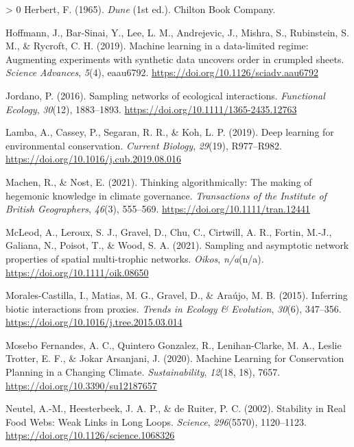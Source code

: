\documentclass[11pt]{article}
\newlength{\cslhangindent}
\newenvironment{CSLReferences}[3] %
 {%
  \setlength{\parindent}{0pt}
  \ifodd #1 \everypar{\setlength{\hangindent}{\cslhangindent}}\ignorespaces\fi
  \ifnum #2 > 0
  \setlength{\parskip}{#2\baselineskip}
  \fi
 }%
 {}
\begin{document}
\begin{CSLReferences}{1}{0}
\leavevmode\hypertarget{ref-Herbert1965Dun}{}%
Herbert, F. (1965). \emph{Dune} (1st ed.). Chilton Book Company.

\leavevmode\hypertarget{ref-Hoffmann2019MacLea}{}%
Hoffmann, J., Bar-Sinai, Y., Lee, L. M., Andrejevic, J., Mishra, S.,
Rubinstein, S. M., \& Rycroft, C. H. (2019). Machine learning in a
data-limited regime: Augmenting experiments with synthetic data uncovers
order in crumpled sheets. \emph{Science Advances}, \emph{5}(4),
eaau6792. \url{https://doi.org/10.1126/sciadv.aau6792}

\leavevmode\hypertarget{ref-Jordano2016SamNet}{}%
Jordano, P. (2016). Sampling networks of ecological interactions.
\emph{Functional Ecology}, \emph{30}(12), 1883--1893.
\url{https://doi.org/10.1111/1365-2435.12763}

\leavevmode\hypertarget{ref-Lamba2019DeeLea}{}%
Lamba, A., Cassey, P., Segaran, R. R., \& Koh, L. P. (2019). Deep
learning for environmental conservation. \emph{Current Biology},
\emph{29}(19), R977--R982.
\url{https://doi.org/10.1016/j.cub.2019.08.016}

\leavevmode\hypertarget{ref-Machen2021ThiAlg}{}%
Machen, R., \& Nost, E. (2021). Thinking algorithmically: The making of
hegemonic knowledge in climate governance. \emph{Transactions of the
Institute of British Geographers}, \emph{46}(3), 555--569.
\url{https://doi.org/10.1111/tran.12441}

\leavevmode\hypertarget{ref-McLeod2021SamAsy}{}%
McLeod, A., Leroux, S. J., Gravel, D., Chu, C., Cirtwill, A. R., Fortin,
M.-J., Galiana, N., Poisot, T., \& Wood, S. A. (2021). Sampling and
asymptotic network properties of spatial multi-trophic networks.
\emph{Oikos}, \emph{n/a}(n/a). \url{https://doi.org/10.1111/oik.08650}

\leavevmode\hypertarget{ref-Morales-Castilla2015InfBio}{}%
Morales-Castilla, I., Matias, M. G., Gravel, D., \& Araújo, M. B.
(2015). Inferring biotic interactions from proxies. \emph{Trends in
Ecology \& Evolution}, \emph{30}(6), 347--356.
\url{https://doi.org/10.1016/j.tree.2015.03.014}

\leavevmode\hypertarget{ref-MoseboFernandes2020MacLea}{}%
Mosebo Fernandes, A. C., Quintero Gonzalez, R., Lenihan-Clarke, M. A.,
Leslie Trotter, E. F., \& Jokar Arsanjani, J. (2020). Machine Learning
for Conservation Planning in a Changing Climate. \emph{Sustainability},
\emph{12}(18, 18), 7657. \url{https://doi.org/10.3390/su12187657}

\leavevmode\hypertarget{ref-Neutel2002StaRea}{}%
Neutel, A.-M., Heesterbeek, J. A. P., \& de Ruiter, P. C. (2002).
Stability in Real Food Webs: Weak Links in Long Loops. \emph{Science},
\emph{296}(5570), 1120--1123.
\url{https://doi.org/10.1126/science.1068326}


\end{CSLReferences}
\end{document}
